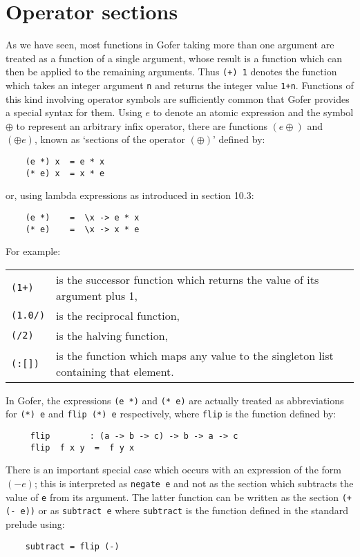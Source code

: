 \section{Operator sections}
As we have seen, most functions in Gofer taking more than one  argument
are treated as a function of a  single  argument,  whose  result  is  a
function which can then be applied to the  remaining  arguments.   Thus
\verb"(+) 1" denotes the function which takes an integer  
argument  \verb"n"  and
returns the integer value \verb"1+n".   Functions  of  this  kind  involving
operator symbols are sufficiently common that Gofer provides a  special
syntax for them.  Using $e$ to denote an atomic expression and the symbol
$\oplus$ to represent an arbitrary infix operator, there are functions 
$(e\oplus)$
and $(\oplus e)$, known as `sections of the operator $(\oplus)$' defined by:
\begin{verbatim}
    (e *) x  = e * x
    (* e) x  = x * e
\end{verbatim}
or, using lambda expressions as introduced in section 10.3:
\begin{verbatim}
    (e *)    =  \x -> e * x
    (* e)    =  \x -> x * e
\end{verbatim}
For example:
\BQ
\begin{tabular}{lp{8cm}}
       \verb"(1+)"&   is the successor function which returns the value
                    of its argument plus 1,\\
       \verb"(1.0/)"& is the reciprocal function,\\
       \verb"(/2)"&   is the halving function,\\
       \verb"(:[])"&  is the function which maps any value to the
                    singleton list containing that element.
\end{tabular}
\EQ

In Gofer, the expressions \verb"(e *)" and \verb"(* e)" 
are actually  treated  as
abbreviations for \verb"(*) e" and \verb"flip (*) e" respectively,  
where  \verb"flip"
is the function defined by:
\begin{verbatim}
     flip        : (a -> b -> c) -> b -> a -> c
     flip  f x y  =  f y x
\end{verbatim}
There is an important special case which occurs with an  expression  of
the form $(- e)$; this is interpreted  as  \verb"negate e"  and  not  as  the
section which subtracts the value of \verb"e" from its argument.  The latter
function can be written as the section \verb"(+ (- e))"  or  as  
\verb"subtract e"
where \verb"subtract" is the function defined in the standard prelude using:
\begin{verbatim}
    subtract = flip (-)
\end{verbatim}

